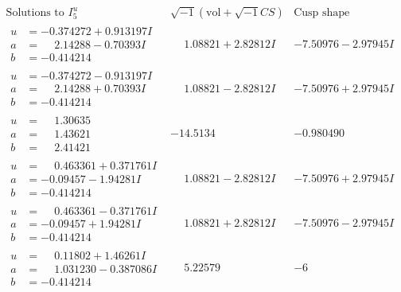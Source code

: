 \documentclass[1p]{elsarticle_modified}
\theoremstyle{definition}
\newcommand{\I}{\sqrt{-1}}
\begin{document}
$$\begin{array}{c|c|c}  
\text{Solutions to }I^u_{5}& \I (\text{vol} + \sqrt{-1}CS) & \text{Cusp shape}\\
 \hline 
\begin{aligned}
u &= -0.374272 + 0.913197 I \\
a &= \phantom{-}2.14288 - 0.70393 I \\
b &= -0.414214\phantom{ +0.000000I}\end{aligned}
 & \phantom{-}1.08821 + 2.82812 I & -7.50976 - 2.97945 I \\ \hline\begin{aligned}
u &= -0.374272 - 0.913197 I \\
a &= \phantom{-}2.14288 + 0.70393 I \\
b &= -0.414214\phantom{ +0.000000I}\end{aligned}
 & \phantom{-}1.08821 - 2.82812 I & -7.50976 + 2.97945 I \\ \hline\begin{aligned}
u &= \phantom{-}1.30635\phantom{ +0.000000I} \\
a &= \phantom{-}1.43621\phantom{ +0.000000I} \\
b &= \phantom{-}2.41421\phantom{ +0.000000I}\end{aligned}
 & -14.5134\phantom{ +0.000000I} & -0.980490\phantom{ +0.000000I} \\ \hline\begin{aligned}
u &= \phantom{-}0.463361 + 0.371761 I \\
a &= -0.09457 - 1.94281 I \\
b &= -0.414214\phantom{ +0.000000I}\end{aligned}
 & \phantom{-}1.08821 - 2.82812 I & -7.50976 + 2.97945 I \\ \hline\begin{aligned}
u &= \phantom{-}0.463361 - 0.371761 I \\
a &= -0.09457 + 1.94281 I \\
b &= -0.414214\phantom{ +0.000000I}\end{aligned}
 & \phantom{-}1.08821 + 2.82812 I & -7.50976 - 2.97945 I \\ \hline\begin{aligned}
u &= \phantom{-}0.11802 + 1.46261 I \\
a &= \phantom{-}1.031230 - 0.387086 I \\
b &= -0.414214\phantom{ +0.000000I}\end{aligned}
 & \phantom{-}5.22579\phantom{ +0.000000I} &                  -6

\end{array}$$
\end{document}
